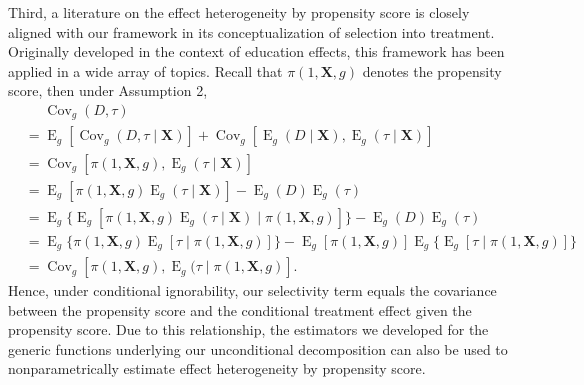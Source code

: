 \documentclass[12pt,a4paper]{article}
\newcommand{\Cov}{\operatorname{Cov}}
\newcommand{\E}{\operatorname{E}}
\def\X{{\boldsymbol X}}
\begin{document}
Third, a literature on the effect heterogeneity by propensity score \citep{brand_who_2010, xie_estimating_2012, brand_uncovering_2021} is  closely aligned with our framework in its conceptualization of selection into treatment. Originally developed in the context of education effects, this framework has been applied in a wide array of topics.
Recall that $\pi(1,\X,g)$ denotes the propensity score, then under Assumption 2,
\begin{align*}
&\phantom{{}={}} \Cov_g(D,\tau)  \\
&= \E_g[\Cov_g(D,\tau \mid \X)] + \Cov_g[\E_g(D \mid \X),\E_g(\tau \mid \X)] \\
&= \Cov_g[\pi(1,\X,g), \E_g(\tau \mid \X)] \\
&= \E_g [\pi(1,\X,g) \E_g(\tau \mid \X)] - \E_g(D)\E_g(\tau) \\
&= \E_g \lbrace \E_g [\pi(1,\X,g) \E_g(\tau \mid \X) \mid \pi(1,\X,g)] \rbrace - \E_g(D)\E_g(\tau) \\
&= \E_g \lbrace \pi(1,\X,g) \E_g[\tau \mid \pi(1,\X,g)] \rbrace - \E_g[\pi(1,\X,g)]\E_g\lbrace\E_g[\tau \mid \pi(1,\X,g)] \rbrace \\
&= \Cov_g [\pi(1,\X,g), \E_g(\tau \mid \pi(1,\X,g)].
\end{align*}
Hence, under conditional ignorability, our selectivity term equals the covariance between the propensity score and the conditional treatment effect given the propensity score. Due to this relationship, the estimators we developed for the generic functions underlying our unconditional decomposition can also be used to nonparametrically estimate effect heterogeneity by propensity score. 
\end{document}
